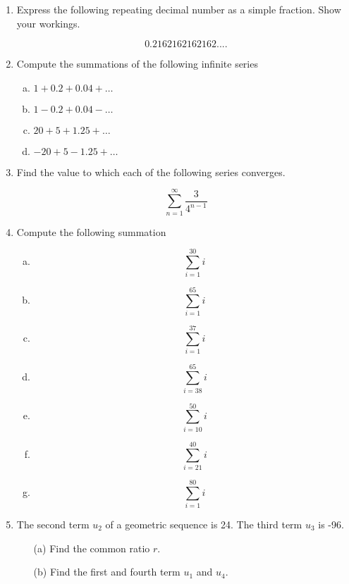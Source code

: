\documentclass[a4paper,12pt]{article}
\begin{document}
\begin{enumerate}
	
	\item  Express the following repeating decimal number as a simple fraction. Show your workings.
	
	\[0.2162162162162....\]
\item 
Compute the summations of the following infinite series
\begin{multicols}{2}
\begin{enumerate}[(a)]
\item $1 + 0.2 + 0.04 + \ldots$
\item $1 - 0.2 + 0.04 - \ldots$
\item $20 + 5 + 1.25 + \ldots$
\item $- 20 + 5 - 1.25 + \ldots$
\end{enumerate}
\end{multicols}
\item 
Find the value to which each of the following series converges.

\[\sum_{n=1}^{\infty} \frac{3}{4^{n-1}}\]


\item  Compute the following summation

\begin{multicols}{4}
	\begin{enumerate}[(a)]
\item	\[ \sum_{i=1}^{30} i \]
\item   \[ \sum_{i=1}^{65} i \]
\item	\[ \sum_{i=1}^{37} i \]
\item 	\[ \sum_{i=38}^{65} i \]
\item   \[ \sum_{i=10}^{50} i  \]
\item \[ \sum_{i=21}^{40} i \]
\item \[ \sum_{i=1}^{80} i \]
	\end{enumerate}
\end{multicols}

\item The second term $u_2$ of a geometric sequence is 24. The third term $u_3$ is -96. 
\begin{itemize}
\item[(a)] Find the common ratio $r$. 
\item[(b)] Find the first and fourth term $u_1$ and $u_4$.
\end{itemize}
	

\end{enumerate}
\end{document}

